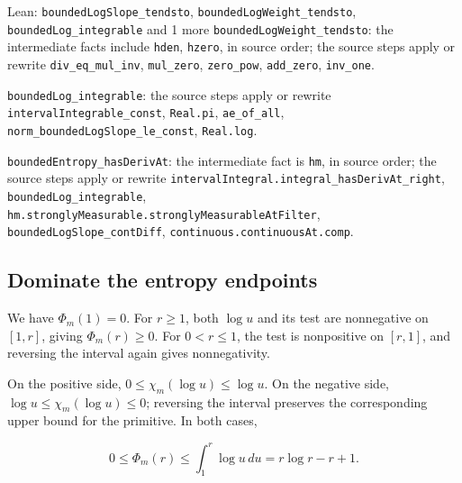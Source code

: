 \documentclass[11pt,a4paper]{report}
\begin{document}
\begin{leanbox}{Lean: \texttt{boundedLogSlope\_\allowbreak{}tendsto}, \texttt{boundedLogWeight\_\allowbreak{}tendsto}, \texttt{boundedLog\_\allowbreak{}integrable} and 1 more}
\texttt{bounded\allowbreak{}Log\allowbreak{}Weight\_\allowbreak{}tendsto}: the intermediate facts include \texttt{hden}, \texttt{hzero}, in source order; the source steps apply or rewrite \texttt{div\_\allowbreak{}eq\_\allowbreak{}mul\_\allowbreak{}inv}, \texttt{mul\_\allowbreak{}zero}, \texttt{zero\_\allowbreak{}pow}, \texttt{add\_\allowbreak{}zero}, \texttt{inv\_\allowbreak{}one}.



\texttt{bounded\allowbreak{}Log\_\allowbreak{}integrable}: the source steps apply or rewrite \texttt{interval\allowbreak{}Integrable\_\allowbreak{}const}, \texttt{Real.\allowbreak{}pi}, \texttt{ae\_\allowbreak{}of\_\allowbreak{}all}, \texttt{norm\_\allowbreak{}bounded\allowbreak{}Log\allowbreak{}Slope\_\allowbreak{}le\_\allowbreak{}const}, \texttt{Real.\allowbreak{}log}.



\texttt{bounded\allowbreak{}Entropy\_\allowbreak{}has\allowbreak{}Deriv\allowbreak{}At}: the intermediate fact is \texttt{hm}, in source order; the source steps apply or rewrite \texttt{interval\allowbreak{}Integral.\allowbreak{}integral\_\allowbreak{}has\allowbreak{}Deriv\allowbreak{}At\_\allowbreak{}right}, \texttt{bounded\allowbreak{}Log\_\allowbreak{}integrable}, \texttt{hm.\allowbreak{}strongly\allowbreak{}Measurable.\allowbreak{}strongly\allowbreak{}Measurable\allowbreak{}At\allowbreak{}Filter}, \texttt{bounded\allowbreak{}Log\allowbreak{}Slope\_\allowbreak{}cont\allowbreak{}Diff}, \texttt{continuous.\allowbreak{}continuous\allowbreak{}At.\allowbreak{}comp}.
\end{leanbox}
\subsection{\texorpdfstring{Dominate the entropy endpoints}{Dominate the entropy endpoints}}
\label{report-step-UnadjustedLangevin-LSI-BoundedLog-lean-4}


We have \(\Phi_m(1)=0\). For \(r\ge1\), both \(\log u\) and its test are nonnegative on \([1,r]\), giving \(\Phi_m(r)\ge0\). For \(0<r\le1\), the test is nonpositive on \([r,1]\), and reversing the interval again gives nonnegativity.



On the positive side, \(0\le\chi_m(\log u)\le\log u\). On the negative side, \(\log u\le\chi_m(\log u)\le0\); reversing the interval preserves the corresponding upper bound for the primitive. In both cases,

\[0\le\Phi_m(r)\le\int_1^r\log u\,du=r\log r-r+1.\]
\end{document}
